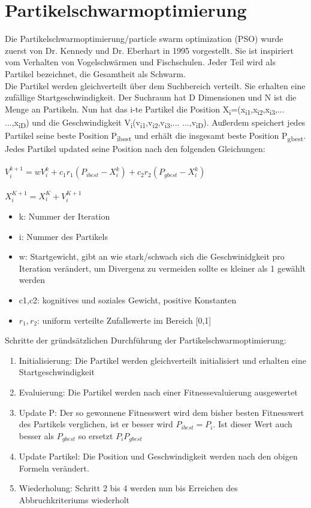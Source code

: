 \section{Partikelschwarmoptimierung}
Die Partikelschwarmoptimierung/particle swarm optimization (PSO) wurde zuerst von Dr. Kennedy und Dr. Eberhart in 1995 vorgestellt\cite{kennedy1942particle}.
 Sie ist inspiriert vom Verhalten von Vogelschwärmen und Fischschulen. Jeder Teil wird als Partikel bezeichnet, die Gesamtheit als Schwarm.
\\ Die Partikel werden gleichverteilt über dem Suchbereich verteilt. Sie erhalten eine zufällige Startgeschwindigkeit. 
Der Suchraum hat D Dimensionen und N ist die Menge an Partikeln. Nun hat das i-te Partikel die Position X\textsubscript{i}=(x\textsubscript{i1},x\textsubscript{i2},x\textsubscript{i3},... ...,x\textsubscript{iD})
  und die Geschwindigkeit V\textsubscript{i}(v\textsubscript{i1},v\textsubscript{i2},v\textsubscript{i3},... ...,v\textsubscript{iD}). Außerdem speichert jedes Partikel seine beste Position P\textsubscript{ibest} und erhält die insgesamt beste Position P\textsubscript{gbest}. 
\\
Jedes Partikel updated seine Position nach den folgenden Gleichungen:\\\\
\large $V_i^{k+1}=wV_i^k+c_1r_1(P_{ibest}-X_i^k)+c_2r_2(P_{gbest}-X_i^k)$
\\\\\normalsize
$X_i^{K+1}=X_i^K+V_i^{K+1}$
\begin{itemize}

  \item k: Nummer der Iteration
  \item i: Nummer des Partikels
  \item w: Startgewicht, gibt an wie stark/schwach sich die Geschwinidgkeit pro Iteration verändert, um Divergenz zu vermeiden sollte es  kleiner als 1 gewählt werden
  \item c1,c2: kognitives und soziales Gewicht, positive Konstanten
  \item $r_1,r_2$: uniform verteilte Zufallswerte im Bereich [0,1]

\end{itemize}
Schritte der gründsätzlichen Durchführung der Partikelschwarmoptimierung:
\begin{enumerate}
  \item Initialisierung: Die Partikel werden gleichverteilt initialisiert und erhalten eine Startgeschwindigkeit
  \item Evaluierung: Die Partikel werden nach einer Fitnessevaluierung ausgewertet 
  \item Update P: Der so gewonnene Fitnesswert wird dem bisher besten Fitnesswert des Partikels verglichen, ist er besser wird $P_{ibest}=P_i$. Ist dieser Wert auch besser als $P_{gbest}$ so ersetzt $P_i P_{gbest}$
  \item Update Partikel: Die Position und Geschwindigkeit werden nach den obigen Formeln verändert.
  \item Wiederholung: Schritt 2 bis 4 werden nun bis Erreichen des Abbruchkriteriums wiederholt
\end{enumerate}\\

